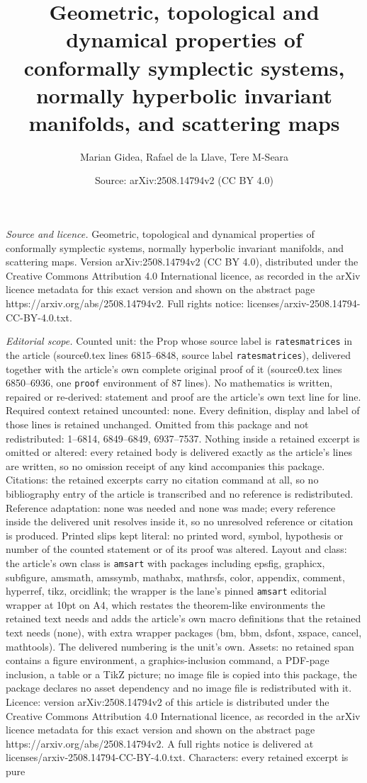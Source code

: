 \documentclass[10pt,a4paper]{amsart}
\title[Geometric, topological and dynamical properties of conformal]{Geometric, topological and dynamical properties of conformally symplectic systems, normally hyperbolic invariant manifolds, and scattering maps}
\author{Marian Gidea, Rafael de la Llave, Tere M-Seara}
\date{Source: arXiv:2508.14794v2 (CC BY 4.0)}
\begin{document}
\maketitle

\noindent\emph{Source and licence.} Geometric, topological and dynamical properties of conformally symplectic systems, normally hyperbolic invariant manifolds, and scattering maps. Version arXiv:2508.14794v2 (CC BY 4.0), distributed under the Creative Commons Attribution 4.0 International licence, as recorded in the arXiv licence metadata for this exact version and shown on the abstract page https://arxiv.org/abs/2508.14794v2. Full rights notice: licenses/arxiv-2508.14794-CC-BY-4.0.txt.\par\smallskip

\noindent\textit{Editorial scope.} Counted unit: the Prop whose source label is \texttt{ratesmatrices} in the article (source0.tex lines 6815--6848, source label \texttt{ratesmatrices}), delivered together with the article's own complete original proof of it (source0.tex lines 6850--6936, one \texttt{proof} environment of 87 lines). No mathematics is written, repaired or re-derived: statement and proof are the article's own text line for line. Required context retained uncounted: none. Every definition, display and label of those lines is retained unchanged. Omitted from this package and not redistributed: 1--6814, 6849--6849, 6937--7537. Nothing inside a retained excerpt is omitted or altered: every retained body is delivered exactly as the article's lines are written, so no omission receipt of any kind accompanies this package. Citations: the retained excerpts carry no citation command at all, so no bibliography entry of the article is transcribed and no reference is redistributed. Reference adaptation: none was needed and none was made; every reference inside the delivered unit resolves inside it, so no unresolved reference or citation is produced. Printed slips kept literal: no printed word, symbol, hypothesis or number of the counted statement or of its proof was altered. Layout and class: the article's own class is \texttt{amsart} with packages including epsfig, graphicx, subfigure, amsmath, amssymb, mathabx, mathrsfs, color, appendix, comment, hyperref, tikz, orcidlink; the wrapper is the lane's pinned \texttt{amsart} editorial wrapper at 10pt on A4, which restates the theorem-like environments the retained text needs and adds the article's own macro definitions that the retained text needs (none), with extra wrapper packages (bm, bbm, dsfont, xspace, cancel, mathtools). The delivered numbering is the unit's own. Assets: no retained span contains a figure environment, a graphics-inclusion command, a PDF-page inclusion, a table or a TikZ picture; no image file is copied into this package, the package declares no asset dependency and no image file is redistributed with it. Licence: version arXiv:2508.14794v2 of this article is distributed under the Creative Commons Attribution 4.0 International licence, as recorded in the arXiv licence metadata for this exact version and shown on the abstract page https://arxiv.org/abs/2508.14794v2. A full rights notice is delivered at licenses/arxiv-2508.14794-CC-BY-4.0.txt. Characters: every retained excerpt is pure 
\end{document}
